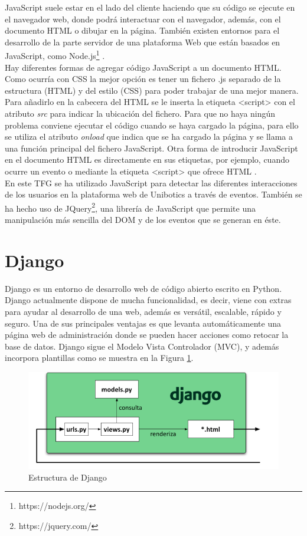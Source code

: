 JavaScript suele estar en el lado del cliente haciendo que su código se ejecute en el navegador web, donde podrá interactuar con el navegador, además, con el documento HTML o dibujar en la página. También existen entornos para el desarrollo de la parte servidor de una plataforma Web que están basados en JavaScript, como Node.js\footnote{https://nodejs.org/} \cite{juan4}.\\
\newpage
Hay diferentes formas de agregar código JavaScript a un documento HTML. Como ocurría con CSS la mejor opción es tener un fichero .js separado de la estructura (HTML) y del estilo (CSS) para poder trabajar de una mejor manera. Para añadirlo en la cabecera del HTML se le inserta la etiqueta {\textless script\textgreater} con el atributo \textit{src} para indicar la ubicación del fichero. Para que no haya ningún problema conviene ejecutar el código cuando se haya cargado la página, para ello se utiliza el atributo \textit{onload} que indica que se ha cargado la página y se llama a una función principal del fichero JavaScript. Otra forma de introducir JavaScript en el documento HTML es directamente en sus etiquetas, por ejemplo, cuando ocurre un evento o mediante la etiqueta {\textless script\textgreater} que ofrece HTML \cite{js}.\\

En este TFG se ha utilizado JavaScript para detectar las diferentes interacciones de los usuarios en la plataforma web de Unibotics a través de eventos. También se ha hecho uso de JQuery\footnote{https://jquery.com/}, una librería de JavaScript que permite una manipulación más sencilla del DOM y de los eventos que se generan en éste. 

\section{Django}
Django es un entorno de desarrollo web de código abierto escrito en Python. Django actualmente dispone de mucha funcionalidad, es decir, viene con extras para ayudar al desarrollo de una web, además es versátil, escalable, rápido y seguro. Una de sus principales ventajas es que  levanta automáticamente una página web de administración donde se pueden hacer acciones como retocar la base de datos. Django sigue el Modelo Vista Controlador (MVC), y además incorpora plantillas como se muestra en la Figura \ref{fig:django}.\\

\begin{figure}[H]
    \centering
    \includegraphics[width=12cm, keepaspectratio]{img/django.png}
    \caption{Estructura de Django}
    \label{fig:django}
\end{figure}

